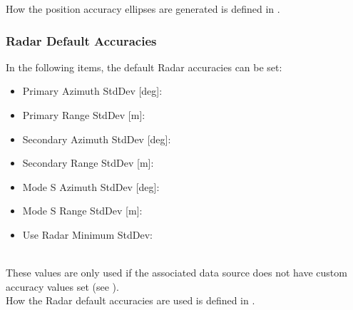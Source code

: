 How the position accuracy ellipses are generated is defined in .

\subsubsection{Radar Default Accuracies}
\label{sec:others_radar_default_accuracies}

In the following items, the default Radar accuracies can be set:

\begin{itemize}
 \item Primary Azimuth StdDev [deg]:
 \item Primary Range StdDev [m]:
 \item Secondary Azimuth StdDev [deg]:
 \item Secondary Range StdDev [m]:
 \item Mode S Azimuth StdDev [deg]:
 \item Mode S Range StdDev [m]:
 \item Use Radar Minimum StdDev:
\end{itemize}
\ \\

These values are only used if the associated data source does not have custom accuracy values set (see ). \\

How the Radar default accuracies are used is defined in .

